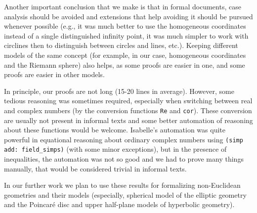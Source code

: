 Another important conclusion that we make is that in formal documents,
case analysis should be avoided and extensions that help avoiding it
should be pursued whenever possible (e.g., it was much better to use
the homogeneous coordinates instead of a single distinguished infinity
point, it was much simpler to work with circlines then to distinguish
between circles and lines, etc.). Keeping different models of the same
concept (for example, in our case, homogeneous coordinates and the
Riemann sphere) also helps, as some proofs are easier in one, and some
proofs are easier in other models.

In principle, our proofs are not long (15-20 lines in
average). However, some tedious reasoning was sometimes required,
especially when switching between real and complex numbers (by the
conversion functions {\tt Re} and {\tt cor}). These conversion are
usually not present in informal texts and some better automation of
reasoning about these functions would be welcome. Isabelle's
automation was quite powerful in equational reasoning about ordinary
complex numbers using {\tt (simp add: field\_simps)} (with some minor
exceptions), but in the presence of inequalities, the automation was
not so good and we had to prove many things manually, that would be
considered trivial in informal texts.

In our further work we plan to use these results for formalizing
non-Euclidean geometries and their models (especially, spherical model
of the elliptic geometry and the Poincar\'e disc and upper half-plane
models of hyperbolic geometry).



{}



